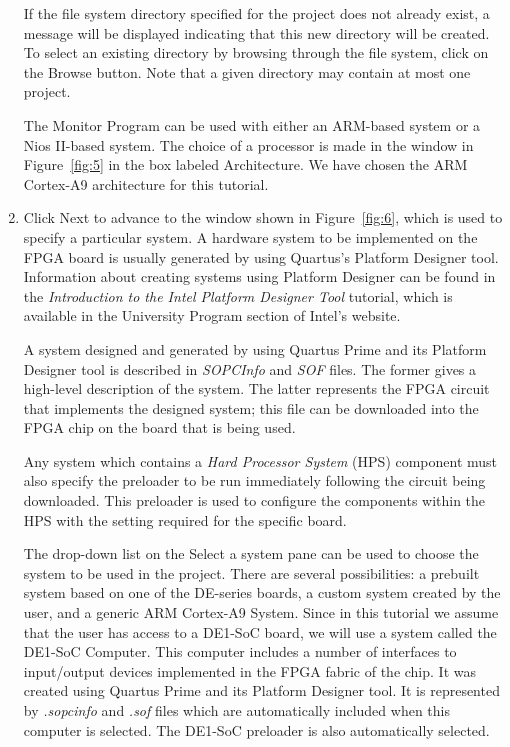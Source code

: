 \documentclass[11pt, twoside, pdftex]{article}
\begin{document}
\begin{enumerate}
If the file system directory specified for the project does not
already exist, a message will be displayed indicating that this
new directory will be created. To select an existing directory
by browsing through the file system, click on the {\sf Browse} button. Note that a given directory may contain at most one
project.

The Monitor Program can be used with either an ARM-based system
or a Nios II-based system. The choice of a processor is made in
the window in Figure~\ref{fig:5} in the box labeled Architecture. 
We have chosen the ARM Cortex-A9 architecture for this tutorial. 

\item
Click {\sf Next} to advance to the window shown in Figure~\ref{fig:6},
which is used to specify a particular system.
A hardware system to be implemented on the FPGA board is usually
generated by using Quartus's Platform Designer tool.
Information about creating systems using Platform Designer can be found in the \emph{Introduction to the Intel Platform Designer Tool} tutorial, which is available in the University Program section of
Intel's website.

A system designed and generated by using Quartus Prime and its Platform Designer
tool is described in \emph{SOPCInfo} and \emph{SOF} files. The
former gives a high-level description of the system. 
The latter represents the FPGA
circuit that implements the designed system; this file can be downloaded into the FPGA chip on the board that is being used.   

Any system which contains a {\it Hard Processor System} (HPS) component must also specify the preloader to be run immediately following the circuit being downloaded. This preloader is used to configure the components within the HPS with the setting required for the specific board. 

The drop-down list on the {\sf Select a system} pane can be used
to choose the system to be used in the project. There are several
possibilities: a prebuilt system based on one of the DE-series boards, a custom
system created by the user, and a generic 
{\sf ARM Cortex-A9 System}. Since in this tutorial we assume that the user has access to a
DE1-SoC board, we will use a system called the DE1-SoC Computer. This computer includes a number of interfaces to 
input/output devices implemented in the FPGA fabric of the chip.
It was created using Quartus Prime and its Platform Designer tool.
It is represented by \emph{.sopcinfo} and \emph{.sof} files
which are automatically included when this computer is selected.
The DE1-SoC preloader is also automatically selected.


\end{enumerate}
\end{document}
